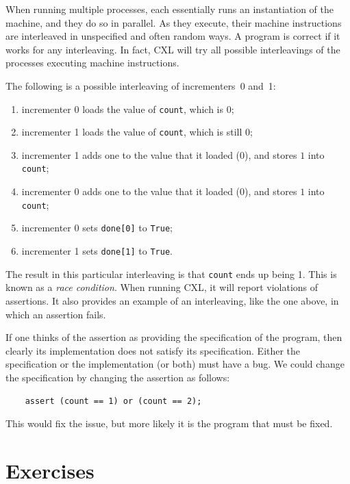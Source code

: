 \documentclass{report}
\newenvironment{code}{
\tcolorbox
}{
\endtcolorbox
}
\begin{document}
When running multiple processes, each essentially runs an instantiation of
the machine, and they do so in parallel.  As they execute, their machine
instructions are interleaved
in unspecified and often random ways.
A program is correct if it works for any interleaving.
In fact, CXL will try all possible interleavings of the processes
executing machine instructions.

The following is a possible interleaving of incrementers~0 and~1:
\begin{enumerate}
\item incrementer 0 loads the value of \texttt{count}, which is 0;
\item incrementer 1 loads the value of \texttt{count}, which is still 0;
\item incrementer 1 adds one to the value that it loaded (0), and
stores $1$ into \texttt{count};
\item incrementer 0 adds one to the value that it loaded (0), and
stores $1$ into \texttt{count};
\item incrementer 0 sets \texttt{done[0]} to \texttt{True};
\item incrementer 1 sets \texttt{done[1]} to \texttt{True}.
\end{enumerate}

The result in this particular interleaving is that \texttt{count} ends up
being 1.
This is known as a \emph{race condition}.
When running CXL, it will
report violations of assertions.  It also provides an example
of an interleaving, like the one above, in which an assertion fails.

If one thinks of the assertion as providing the specification of the
program, then clearly its implementation does not satisfy its specification.
Either the specification or the implementation (or both) must have a bug.
We could change the specification by changing the assertion as follows:

\begin{code}
\begin{verbatim}
    assert (count == 1) or (count == 2);
\end{verbatim}
\end{code}

This would fix the issue, but more likely it is the program that must
be fixed.

\section*{Exercises}
\end{document}
